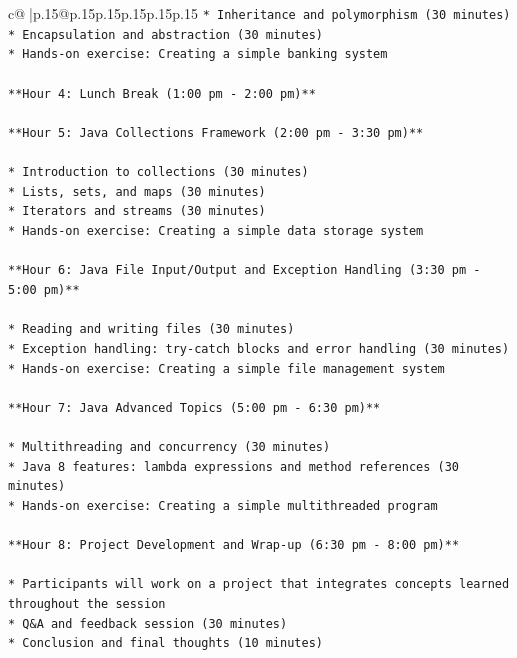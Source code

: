 \documentclass{article}
\begin{document}
{\begin{supertabular}{c@{$\;$}|p{.15\linewidth}@{}p{.15\linewidth}p{.15\linewidth}p{.15\linewidth}p{.15\linewidth}p{.15\linewidth}}
{{{\texttt{* Inheritance and polymorphism (30 minutes)} \\
\texttt{* Encapsulation and abstraction (30 minutes)} \\
\texttt{* Hands{-}on exercise: Creating a simple banking system} \\
\\ 
\texttt{**Hour 4: Lunch Break (1:00 pm {-} 2:00 pm)**} \\
\\ 
\texttt{**Hour 5: Java Collections Framework (2:00 pm {-} 3:30 pm)**} \\
\\ 
\texttt{* Introduction to collections (30 minutes)} \\
\texttt{* Lists, sets, and maps (30 minutes)} \\
\texttt{* Iterators and streams (30 minutes)} \\
\texttt{* Hands{-}on exercise: Creating a simple data storage system} \\
\\ 
\texttt{**Hour 6: Java File Input/Output and Exception Handling (3:30 pm {-} 5:00 pm)**} \\
\\ 
\texttt{* Reading and writing files (30 minutes)} \\
\texttt{* Exception handling: try{-}catch blocks and error handling (30 minutes)} \\
\texttt{* Hands{-}on exercise: Creating a simple file management system} \\
\\ 
\texttt{**Hour 7: Java Advanced Topics (5:00 pm {-} 6:30 pm)**} \\
\\ 
\texttt{* Multithreading and concurrency (30 minutes)} \\
\texttt{* Java 8 features: lambda expressions and method references (30 minutes)} \\
\texttt{* Hands{-}on exercise: Creating a simple multithreaded program} \\
\\ 
\texttt{**Hour 8: Project Development and Wrap{-}up (6:30 pm {-} 8:00 pm)**} \\
\\ 
\texttt{* Participants will work on a project that integrates concepts learned throughout the session} \\
\texttt{* Q\&A and feedback session (30 minutes)} \\
\texttt{* Conclusion and final thoughts (10 minutes)} \\
}}}
\end{supertabular}}
\end{document}
